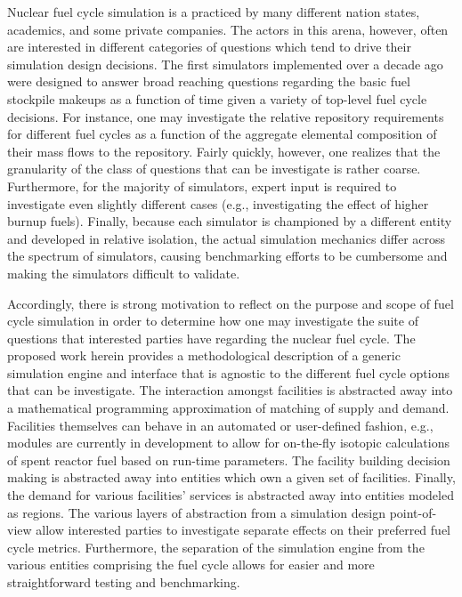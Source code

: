 Nuclear fuel cycle simulation is a practiced by many different nation states,
academics, and some private companies. The actors in this arena, however, often
are interested in different categories of questions which tend to drive their
simulation design decisions. The first simulators implemented over a decade ago
were designed to answer broad reaching questions regarding the basic fuel
stockpile makeups as a function of time given a variety of top-level fuel cycle
decisions. For instance, one may investigate the relative repository
requirements for different fuel cycles as a function of the aggregate elemental
composition of their mass flows to the repository. Fairly quickly, however, one
realizes that the granularity of the class of questions that can be investigate
is rather coarse. Furthermore, for the majority of simulators, expert input is
required to investigate even slightly different cases (e.g., investigating the
effect of higher burnup fuels). Finally, because each simulator is championed by
a different entity and developed in relative isolation, the actual simulation
mechanics differ across the spectrum of simulators, causing benchmarking efforts
to be cumbersome and making the simulators difficult to validate. 

Accordingly, there is strong motivation to reflect on the purpose and scope of
fuel cycle simulation in order to determine how one may investigate the suite of
questions that interested parties have regarding the nuclear fuel cycle. The
proposed work herein provides a methodological description of a generic
simulation engine and interface that is agnostic to the different fuel cycle
options that can be investigate. The interaction amongst facilities is
abstracted away into a mathematical programming approximation of matching of
supply and demand. Facilities themselves can behave in an automated or
user-defined fashion, e.g., modules are currently in development to allow for
on-the-fly isotopic calculations of spent reactor fuel based on run-time
parameters. The facility building decision making is abstracted away into
entities which own a given set of facilities. Finally, the demand for various
facilities' services is abstracted away into entities modeled as regions. The
various layers of abstraction from a simulation design point-of-view allow
interested parties to investigate separate effects on their preferred fuel cycle
metrics. Furthermore, the separation of the simulation engine from the various
entities comprising the fuel cycle allows for easier and more straightforward
testing and benchmarking.

